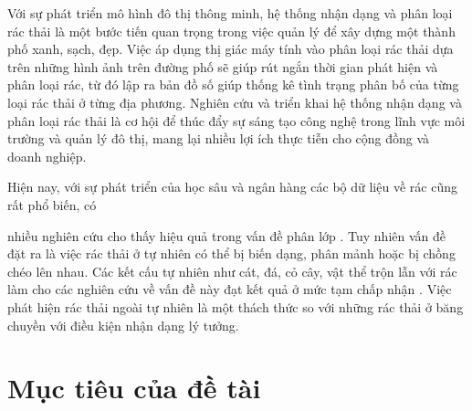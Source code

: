 \documentclass[../the.tex]{subfiles}
\begin{document}
\bigskip

{\fontsize{13}{12} \selectfont
Với sự phát triển mô hình đô thị thông minh, hệ thống nhận dạng và phân loại rác thải là một bước tiến quan trọng trong việc quản lý để xây dựng một thành phố xanh, sạch, đẹp.
Việc áp dụng thị giác máy tính vào phân loại rác thải dựa trên những hình ảnh trên đường phố sẽ giúp rút ngắn thời gian phát hiện và phân loại rác, từ đó lập ra bản đồ số giúp thống kê tình trạng phân bố của từng loại rác thải ở từng địa phương. Nghiên cứu và triển khai hệ thống nhận dạng và phân loại rác thải là cơ hội để thúc đẩy sự sáng tạo công nghệ trong lĩnh vực môi trường và quản lý đô thị, mang lại nhiều lợi ích thực tiễn cho cộng đồng và doanh nghiệp.

}

\bigskip

{\fontsize{13}{12} \selectfont 

Hiện nay, với sự phát triển của học sâu và ngân hàng các bộ dữ liệu về rác cũng rất phổ biến, có 

nhiều nghiên cứu cho thấy hiệu quả trong vấn đề phân lớp \cite{yang2016classification} \cite{shah2022method} \cite{ahmad2020intelligent}. 
Tuy nhiên vấn đề đặt ra là việc rác thải ở tự nhiên có thể bị biến dạng, phân mảnh hoặc bị chồng chéo lên nhau.
Các kết cấu tự nhiên như cát, đá, cỏ cây, vật thể trộn lẫn với rác làm cho các nghiên cứu về vấn đề này đạt kết quả ở mức tạm chấp nhận \cite{Majchrowska_2022} \cite{9122693} \cite{8793975} \cite{proença2020taco}.
Việc phát hiện rác thải ngoài tự nhiên là một thách thức so với những rác thải ở băng chuyền với điều kiện nhận dạng lý tưởng.

}


\section{Mục tiêu của đề tài}
\label{muc_tieu}
\end{document}

